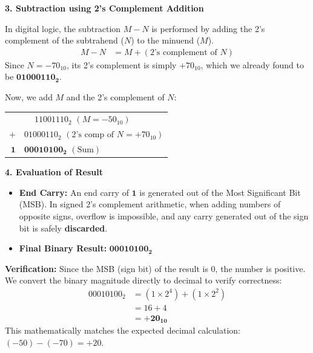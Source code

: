\documentclass[12pt,a3paper]{article}
\begin{document}
\begin{enumerate}
\begin{tcolorbox}[enhanced,breakable,ansbox,colback=cD!4,colframe=cD,boxrule=0.8pt,arc=5pt,title={\textbf{Answer}},fonttitle=\bfseries\color{white},colbacktitle=cD]
\vspace{1em}
\textbf{\textcolor{cD}{3. Subtraction using 2's Complement Addition}}

In digital logic, the subtraction $M - N$ is performed by adding the 2's complement of the subtrahend ($N$) to the minuend ($M$).
\begin{align*}
    M - N &= M + (\text{2's complement of } N)
\end{align*}
Since $N = -70_{10}$, its 2's complement is simply $+70_{10}$, which we already found to be $\mathbf{01000110_2}$.

Now, we add $M$ and the 2's complement of $N$:
\begin{center}
\renewcommand{\arraystretch}{1.2}
\begin{tabular}{r@{\quad}l}
      & $\phantom{+}11001110_2$ \quad $(M = -50_{10})$ \\
  $+$ & $01000110_2$ \quad $(\text{2's comp of } N = +70_{10})$ \\
  \midrule
  $\mathbf{1}$ & $\mathbf{00010100_2}$ \quad $(\text{Sum})$
\end{tabular}
\end{center}

\vspace{1em}
\textbf{\textcolor{cD}{4. Evaluation of Result}}

\begin{itemize}
    \item \textbf{End Carry:} An end carry of $\mathbf{1}$ is generated out of the Most Significant Bit (MSB). In signed 2's complement arithmetic, when adding numbers of opposite signs, overflow is impossible, and any carry generated out of the sign bit is safely \textbf{discarded}.
    \item \textbf{Final Binary Result:} $\mathbf{00010100_2}$
\end{itemize}

\textbf{Verification:}
Since the MSB (sign bit) of the result is $0$, the number is positive. We convert the binary magnitude directly to decimal to verify correctness:
\begin{align*}
    00010100_2 &= (1 \times 2^4) + (1 \times 2^2) \\
    &= 16 + 4 \\
    &= \mathbf{+20_{10}}
\end{align*}
This mathematically matches the expected decimal calculation: $(-50) - (-70) = +20$.

\end{tcolorbox}


\end{enumerate}
\end{document}
